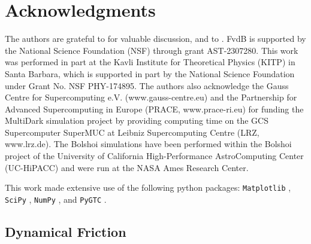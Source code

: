 \documentclass[twocolumn,apj,numberedappendix,twocolappendix,iop]{openjournal}
\begin{document}
\section*{Acknowledgments}

The authors are grateful to  for valuable discussion, and to . FvdB is supported by the National Science Foundation (NSF) through grant AST-2307280. This work was performed in part at the Kavli Institute for Theoretical Physics (KITP) in Santa Barbara, which is supported in part by the National Science Foundation under Grant No. NSF PHY-174895. The authors also acknowledge the Gauss Centre for Supercomputing e.V. (www.gauss-centre.eu) and the Partnership for Advanced Supercomputing in Europe (PRACE, www.prace-ri.eu) for funding the MultiDark simulation project by providing computing time on the GCS Supercomputer SuperMUC at Leibniz Supercomputing Centre (LRZ, www.lrz.de). The Bolshoi simulations have been performed within the Bolshoi project of the University of California High-Performance AstroComputing Center (UC-HiPACC) and were run at the NASA Ames Research Center.

This work made extensive use of the following python packages: \texttt{Matplotlib} \citep{Matplotlib_Hunter2007}, \texttt{SciPy} \citep{SciPy_Virtanen2020}, \texttt{NumPy} \citep{numpy_vanderWalt2011}, and \texttt{PyGTC} \citep{PyGTC_Bocquet2016}. 





\appendix

\subsection{Dynamical Friction}
\label{sec:DF}

\end{document}
